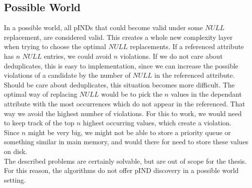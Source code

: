 \subsection*{Possible World}
In a possible world, all pINDs that could become valid under some $NULL$ replacement, are considered valid. This creates a whole new complexity layer when trying to choose the optimal $NULL$ replacements. If a referenced attribute has $n$ $NULL$ entries, we could avoid $n$ violations. If we do not care about deduplicates, this is easy to implementation, since we can increase the possible violations of a candidate by the number of $NULL$ in the referenced attribute. Should be care about deduplicates, this situation becomes more difficult. The optimal way of replacing $NULL$ would be to pick the $n$ values in the dependant attribute with the most occurrences which do not appear in the referenced. That way we avoid the highest number of violations. For this to work, we would need to keep track of the top $n$ highest occurring values, which create a violation. Since $n$ might be very big, we might not be able to store a priority queue or something similar in main memory, and would there for need to store these values on disk.
\\

\noindent The described problems are certainly solvable, but are out of scope for the thesis. For this reason, the algorithms do not offer pIND discovery in a possible world setting.
